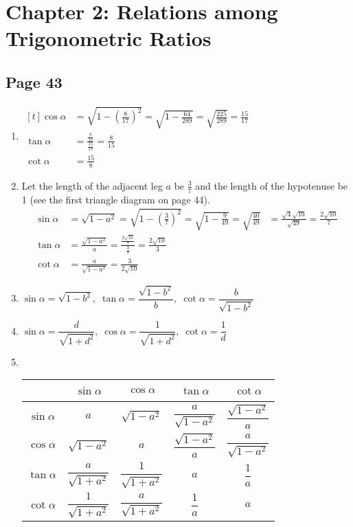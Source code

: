 \documentclass{article}
\newenvironment{solutions}[1]
{\subsection*{#1}
 \begin{enumerate}[leftmargin=1.5em]}
{\end{enumerate}}
\newcommand{\solution}{\item}
\begin{document}
\section*{Chapter 2: Relations among Trigonometric Ratios}

\begin{solutions}{Page 43}
\solution %
$\begin{aligned}[t]
\cos{\alpha} &= \sqrt{1 - \left(\frac{8}{17}\right)^2} = \sqrt{1 - \frac{64}{289}} = \sqrt{\frac{225}{289}} = \frac{15}{17} \\
\tan{\alpha} &= \frac{\frac{8}{17}}{\frac{15}{17}} = \frac{8}{15} \\
\cot{\alpha} &= \frac{15}{8}
\end{aligned}$

\solution %
Let the length of the adjacent leg $a$ be $\frac{3}{7}$ and the length of the hypotenuse be 1 (see the first triangle diagram on page 44).
\begin{align*}
\sin{\alpha} &= \sqrt{1 - a^2} = \sqrt{1 - \left(\frac{3}{7}\right)^2} = \sqrt{1 - \frac{9}{49}} = \sqrt{\frac{40}{49}} &= \frac{\sqrt{4}\sqrt{10}}{\sqrt{49}} = \frac{2\sqrt{10}}{7} \\
\tan{\alpha} &= \frac{\sqrt{1 - a^2}}{a} = \frac{\frac{2\sqrt{10}}{7}}{\frac{3}{7}} = \frac{2\sqrt{10}}{3} \\
\cot{\alpha} &= \frac{a}{\sqrt{1 - a^2}} = \frac{3}{2\sqrt{10}}
\end{align*}

\solution %
$\sin{\alpha} = \sqrt{1 - b^2},\;
\tan{\alpha} = \dfrac{\sqrt{1 - b^2}}{b},\; 
\cot{\alpha} = \dfrac{b}{\sqrt{1 - b^2}}$

\solution %
$\sin{\alpha} = \dfrac{d}{\sqrt{1 + d^2}},\;
\cos{\alpha} = \dfrac{1}{\sqrt{1 + d^2}},\;
\cot{\alpha} = \dfrac{1}{d}$

\solution ~ %
\begin{center}
\bgroup
\def\arraystretch{2.1}
\setlength\tabcolsep{15pt}
\begin{tabular}{ |c|c|c|c|c| }
\hline
~              & $\sin{\alpha}$             & $\cos{\alpha}$             & $\tan{\alpha}$             & $\cot{\alpha}$ \\
\hline
$\sin{\alpha}$ & $a$                        & $\sqrt{1 - a^2}$           & $\dfrac{a}{\sqrt{1 - a^2}}$ & $\dfrac{\sqrt{1 - a^2}}{a}$ \\
\hline
$\cos{\alpha}$ & $\sqrt{1 - a^2}$           & $a$                        & $\dfrac{\sqrt{1 - a^2}}{a}$ & $\dfrac{a}{\sqrt{1 - a^2}}$ \\
\hline
$\tan{\alpha}$ & $\dfrac{a}{\sqrt{1 + a^2}}$ & $\dfrac{1}{\sqrt{1 + a^2}}$ & $a$                       & $\dfrac{1}{a}$ \\
\hline
$\cot{\alpha}$ & $\dfrac{1}{\sqrt{1 + a^2}}$ & $\dfrac{a}{\sqrt{1 + a^2}}$ & $\dfrac{1}{a}$              & $a$ \\
\hline
\end{tabular}
\egroup
\end{center}


\end{solutions}
\end{document}
